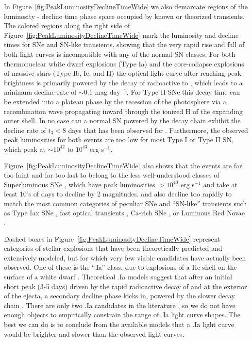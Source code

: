 In Figure~\ref{fig:PeakLuminosityDeclineTimeWide} we also demarcate
regions of the luminosity - decline time phase space occupied by known
or theorized transients.
The colored regions along the right
side of Figure~\ref{fig:PeakLuminosityDeclineTimeWide} mark the
luminosity and decline times for SNe and SN-like transients, showing
that the very rapid rise and fall of both \spock light curves is
incompatible with any of the normal SN classes.  For both
thermonuclear white dwarf explosions (Type Ia) and the core-collapse
explosions of massive stars (Type Ib, Ic, and II) the optical light
curve after reaching peak brightness is primarily powered by the decay
of radioactive \NiFiftySix to \CoFiftySix, which leads to a minimum
decline rate of $\sim$0.1 mag day$^{-1}$.  For Type II SNe this decay
time can be extended into a plateau phase by the recession of the
photosphere via a recombination wave propagating inward through the
ionized H of the expanding outer shell.  In no case can a normal SN
powered by the \NiFiftySix decay chain exhibit the decline rate of
$t_3<8$ days that has been observed for \spock.  Furthermore, the
observed peak luminosities for both \spock events are too low for most
Type I or Type II SN, which peak at $\sim10^{42}$ to $10^{43}$ erg
s$^{-1}$.

Figure~\ref{fig:PeakLuminosityDeclineTimeWide} also shows that the
\spock events are far too faint and far too fast to belong to the less
well-understood classes of Superluminous SNe
\citep{Gal-Yam:2012,Arcavi:2016}, which have peak luminosities
$>10^{43}$ erg s$^{-1}$ and take at least 10's of days to decline by 2
magnitudes.  \spockone and \spocktwo also decline too rapidly to match
the most common categories of peculiar SNe and ``SN-like'' transients
such as Type Iax SNe \citep{Foley:2013a}, fast optical transients
\citep{Drout:2014}, Ca-rich SNe
\citep{Filippenko:2003,Perets:2011,Kasliwal:2012}, or Luminous Red
Novae \citep[also called intermediate luminosity red
  transients][]{Munari:2002,Kulkarni:2007,Kasliwal:2011}.

Dashed boxes in Figure~\ref{fig:PeakLuminosityDeclineTimeWide}
represent categories of stellar explosions that have been
theoretically predicted and extensively modeled, but for which very
few viable candidates have actually been observed.  One of these is
the ``.Ia'' class, due to explosions of a He shell on the surface of a
white dwarf \citep{Bildsten:2007}.  Theoretical .Ia models suggest
that after an initial short peak (3-5 days) driven by the rapid
radioactive decay of  and  at the exterior of
the ejecta, a secondary decline phase kicks in, powered by the slower
 decay chain \citep{Shen:2010}.  There are only two .Ia
candidates in the literature \citep{Poznanski:2010,Kasliwal:2010}, so
we do not have enough objects to empirically constrain the range of
.Ia light curve shapes.  The best we can do is to conclude from the
available models that a .Ia light curve would be brighter and slower
than the observed \spock light curves.

